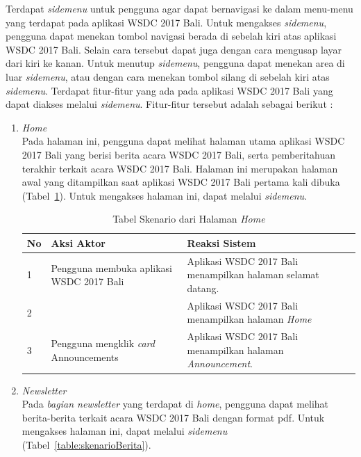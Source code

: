 Terdapat {\it sidemenu} untuk pengguna agar dapat bernavigasi ke dalam menu-menu yang terdapat pada aplikasi WSDC 2017 Bali. Untuk mengakses {\it sidemenu}, pengguna dapat menekan tombol navigasi berada di sebelah kiri atas aplikasi WSDC 2017 Bali. Selain cara tersebut dapat juga dengan cara mengusap layar dari kiri ke kanan. Untuk menutup {\it sidemenu}, pengguna dapat menekan area di luar {\it sidemenu}, atau dengan cara menekan tombol silang di sebelah kiri atas {\it sidemenu}. Terdapat fitur-fitur yang ada pada aplikasi WSDC 2017 Bali yang dapat diakses melalui {\it sidemenu}. Fitur-fitur tersebut adalah sebagai berikut :
\newpage
\begin{enumerate}
	\item \textit{Home} \\
	Pada halaman ini, pengguna dapat melihat halaman utama aplikasi WSDC 2017 Bali yang berisi berita acara WSDC 2017 Bali, serta pemberitahuan terakhir terkait acara WSDC 2017 Bali. Halaman ini merupakan halaman awal yang ditampilkan saat aplikasi WSDC 2017 Bali pertama kali dibuka (Tabel~\ref{table:skenarioHalamanUtama}). Untuk mengakses halaman ini, dapat melalui \textit{sidemenu}.
		\begin{table}[H]
			\centering
			\caption{Tabel Skenario dari Halaman \textit{Home}}
			\begin{tabular}{|p{0.5cm}|p{7cm}|p{7cm}|}
				\hline
				No & Aksi Aktor                               & Reaksi Sistem                                          \\ \hline
				1  & Pengguna membuka aplikasi WSDC 2017 Bali & Aplikasi WSDC 2017 Bali menampilkan halaman selamat datang. \\ \hline
				2  &                                          & Aplikasi WSDC 2017 Bali menampilkan halaman \textit{Home}           \\ \hline
				3  & Pengguna mengklik {\it card} Announcements & Aplikasi WSDC 2017 Bali menampilkan halaman \textit{Announcement}. \\ \hline
			\end{tabular}
			\label{table:skenarioHalamanUtama}
		\end{table}
	\item \textit{Newsletter} \\ 
	Pada \textit{bagian newsletter} yang terdapat di \textit{home}, pengguna dapat melihat berita-berita terkait acara WSDC 2017 Bali dengan format pdf. Untuk mengakses halaman ini, dapat melalui \textit{sidemenu} (Tabel~\ref{table:skenarioBerita}).

\end{enumerate}
